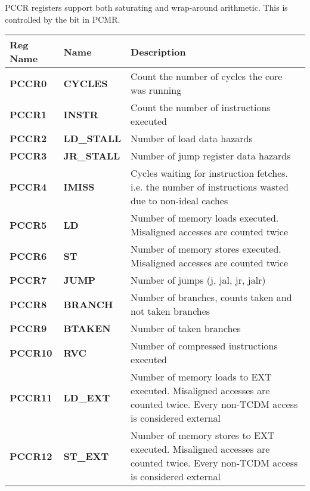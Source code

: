 
PCCR registers support both saturating and wrap-around arithmetic. This is
controlled by the  bit in PCMR.

\begin{table}[H]
\begin{tabularx}{\textwidth}{@{}llX@{}} \toprule
  \textbf{Reg Name} & \textbf{Name}       & Description \\ \toprule
  \textbf{PCCR0}  & \textbf{CYCLES}       & Count the number of cycles the core was running \\ \hline
  \textbf{PCCR1}  & \textbf{INSTR}        & Count the number of instructions executed \\ \hline
  \textbf{PCCR2}  & \textbf{LD\_STALL}    & Number of load data hazards \\ \hline
  \textbf{PCCR3}  & \textbf{JR\_STALL}    & Number of jump register data hazards \\ \hline
  \textbf{PCCR4}  & \textbf{IMISS}        & Cycles waiting for instruction fetches. i.e. the number of instructions wasted due to non-ideal caches \\ \hline
  \textbf{PCCR5}  & \textbf{LD}           & Number of memory loads executed. Misaligned accesses are counted twice \\ \hline
  \textbf{PCCR6}  & \textbf{ST}           & Number of memory stores executed. Misaligned accesses are counted twice \\ \hline
  \textbf{PCCR7}  & \textbf{JUMP}         & Number of jumps (j, jal, jr, jalr)\\ \hline
  \textbf{PCCR8}  & \textbf{BRANCH}       & Number of branches, counts taken and not taken branches\\ \hline
  \textbf{PCCR9}  & \textbf{BTAKEN}       & Number of taken branches \\ \hline
  \textbf{PCCR10} & \textbf{RVC}          & Number of compressed instructions executed \\ \hline
  \textbf{PCCR11} & \textbf{LD\_EXT}      & Number of memory loads to EXT executed. Misaligned accesses are counted twice. Every non-TCDM access is considered external \\ \hline
  \textbf{PCCR12} & \textbf{ST\_EXT}      & Number of memory stores to EXT executed. Misaligned accesses are counted twice. Every non-TCDM access is considered external \\ \hline

\end{tabularx}
\end{table}
